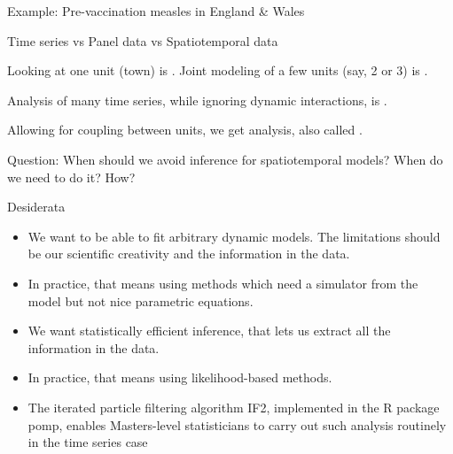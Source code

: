 \documentclass{beamer}
\begin{document}
\begin{frame}{Example: Pre-vaccination measles in England \& Wales}

\end{frame}

\begin{frame}{Time series vs Panel data vs Spatiotemporal data}

  \bi
\item Looking at one unit (town) is . Joint modeling of a few units (say, 2 or 3) is .

\item Analysis of many time series, while ignoring dynamic interactions, is .

\item Allowing for coupling between units, we get  analysis, also called .

  \ei
  
Question: When should we avoid inference for spatiotemporal models? When do we need to do it? How?

\end{frame}

\begin{frame}{Desiderata}

  \begin{itemize}
    \item We want to be able to fit arbitrary dynamic models. The limitations should be our scientific creativity and the information in the data.

    \item In practice, that means using  methods which need a simulator from the model but not nice parametric equations.

    \item We want statistically efficient inference, that lets us extract all the information in the data.

    \item In practice, that means using likelihood-based methods.

      \item The iterated particle filtering algorithm IF2, implemented in the R package pomp, enables Masters-level statisticians to carry out such analysis routinely in the time series case \url{}
      \end{itemize}
  \end{frame}
\end{document}
